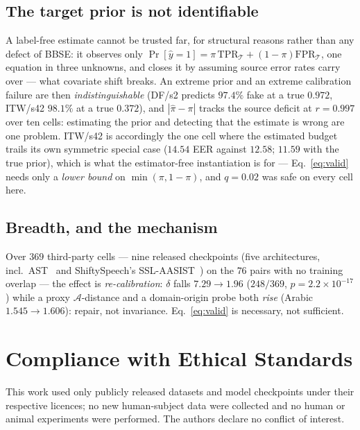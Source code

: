 \documentclass[10pt,letterpaper]{article}
\begin{document}
\subsection{The target prior is not identifiable}
\label{sec:ident}
A label-free estimate cannot be trusted far, for structural reasons rather than
any defect of BBSE: it observes only $\Pr[\hat
y{=}1]=\pi\,\mathrm{TPR}_{\mathcal T}+(1{-}\pi)\mathrm{FPR}_{\mathcal T}$, one
equation in three unknowns, and closes it by assuming source error rates carry
over --- what covariate shift breaks. An extreme prior and an extreme
calibration failure are then \emph{indistinguishable} (DF/s2 predicts $97.4\%$
fake at a true $0.972$, ITW/s42 $98.1\%$ at a true $0.372$), and $|\hat\pi-\pi|$
tracks the source deficit at $r{=}0.997$ over ten cells: estimating the prior and
detecting that the estimate is wrong are one problem. ITW/s42 is accordingly the
one cell where the estimated budget trails its own symmetric special case
($14.54$ EER against $12.58$; $11.59$ with the true prior), which is what the
estimator-free instantiation is for --- Eq.~\eqref{eq:valid} needs only a
\emph{lower bound} on $\min(\pi,1{-}\pi)$, and $q{=}0.02$ was safe on every cell
here.

\subsection{Breadth, and the mechanism}
Over $369$ third-party cells --- nine released checkpoints (five architectures,
incl.\ AST~\cite{ast} and ShiftySpeech's SSL-AASIST~\cite{shiftyspeech}) on the
$76$ pairs with no training overlap --- the effect is \emph{re-calibration}:
$\delta$ falls $7.29\!\to\!1.96$ ($248/369$, $p{=}2.2{\times}10^{-17}$) while a
proxy $\mathcal{A}$-distance and a domain-origin probe both \emph{rise} (Arabic
$1.545\!\to\!1.606$): repair, not invariance. Eq.~\eqref{eq:valid} is necessary,
not sufficient.

\section*{Compliance with Ethical Standards}
This work used only publicly released datasets and model checkpoints under their
respective licences; no new human-subject data were collected and no human or
animal experiments were performed. The authors declare no conflict of interest.
\end{document}
